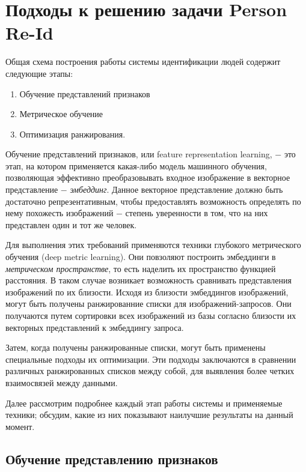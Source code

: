 \chapter{Подходы к решению задачи Person Re-Id}
\label{ch:closed-world}

 Общая схема построения работы системы идентификации людей содержит следующие этапы:

 \begin{enumerate}
     \item Обучение представлений признаков

     \item Метрическое обучение

     \item Оптимизация ранжирования.
    
 \end{enumerate}

 Обучение представлений признаков, или feature representation learning, $-$ это этап, на котором применяется какая-либо модель машинного обучения, позволяющая эффективно преобразовывать входное изображение в векторное представление $-$ \textit{эмбеддинг}. Данное векторное представление должно быть достаточно репрезентативным, чтобы предоставлять возможность определять по нему похожесть изображений $-$ степень уверенности в том, что на них представлен один и тот же человек. 

 Для выполнения этих требований применяются техники глубокого метрического обучения (deep metric learning). Они повзоляют построить эмбеддинги в \textit{метрическом пространстве}, то есть наделить их пространство функцией расстояния. В таком случае возникает возможность сравнивать представления изображений по их близости. Исходя из близости эмбеддингов изображений, могут быть получены ранжированние списки для изображений-запросов. Они получаются путем сортировки всех изображений из базы согласно близости их векторных представлений к эмбеддингу запроса.

 Затем, когда получены ранжированные списки, могут быть применены специальные подходы их оптимизации. Эти подходы заключаются в сравнении различных ранжированных списков между собой, для выявления более четких взаимосвязей между данными.

 Далее рассмотрим подробнее каждый этап работы системы и применяемые техники; обсудим, какие из них показывают наилучшие результаты на данный момент.


 \section{Обучение представлению признаков}

